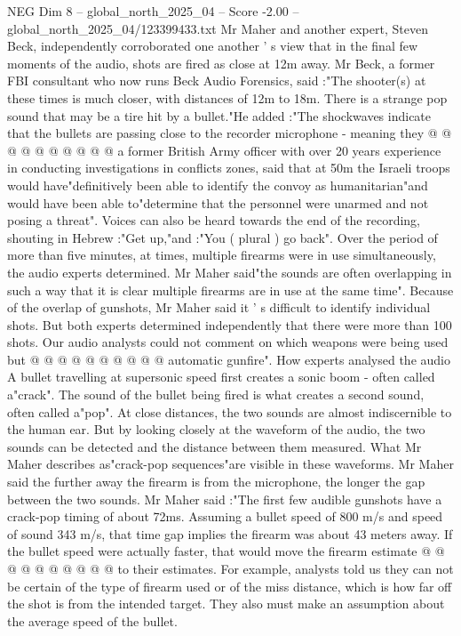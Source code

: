 \begin{textsample}{NEG Dim 8 – global\_north\_2025\_04 – Score -2.00 – global\_north\_2025\_04/123399433.txt}
Mr Maher and another expert, Steven Beck, independently corroborated one another ' s view that in the final few moments of the audio, shots are fired as close at 12m away.
Mr Beck, a former FBI consultant who now runs Beck Audio Forensics, said :"The shooter(s) at these times is much closer, with distances of 12m to 18m.
There is a strange pop sound that may be a tire hit by a bullet."He added :"The shockwaves indicate that the bullets are passing close to the recorder microphone - meaning they @ @ @ @ @ @ @ @ @ @ a former British Army officer with over 20 years experience in conducting investigations in conflicts zones, said that at 50m the Israeli troops would have"definitively been able to identify the convoy as humanitarian"and would have been able to"determine that the personnel were unarmed and not posing a threat".
Voices can also be heard towards the end of the recording, shouting in Hebrew :"Get up,"and :"You ( plural ) go back".
Over the period of more than five minutes, at times, multiple firearms were in use simultaneously, the audio experts determined.
Mr Maher said"the sounds are often overlapping in such a way that it is clear multiple firearms are in use at the same time".
Because of the overlap of gunshots, Mr Maher said it ' s difficult to identify individual shots.
But both experts determined independently that there were more than 100 shots.
Our audio analysts could not comment on which weapons were being used but @ @ @ @ @ @ @ @ @ @ automatic gunfire".
How experts analysed the audio A bullet travelling at supersonic speed first creates a sonic boom - often called a"crack".
The sound of the bullet being fired is what creates a second sound, often called a"pop".
At close distances, the two sounds are almost indiscernible to the human ear.
But by looking closely at the waveform of the audio, the two sounds can be detected and the distance between them measured.
What Mr Maher describes as"crack-pop sequences"are visible in these waveforms.
Mr Maher said the further away the firearm is from the microphone, the longer the gap between the two sounds.
Mr Maher said :"The first few audible gunshots have a crack-pop timing of about 72ms.
Assuming a bullet speed of 800 m/s and speed of sound 343 m/s, that time gap implies the firearm was about 43 meters away.
If the bullet speed were actually faster, that would move the firearm estimate @ @ @ @ @ @ @ @ @ @ to their estimates.
For example, analysts told us they can not be certain of the type of firearm used or of the miss distance, which is how far off the shot is from the intended target.
They also must make an assumption about the average speed of the bullet.

\end{textsample}
